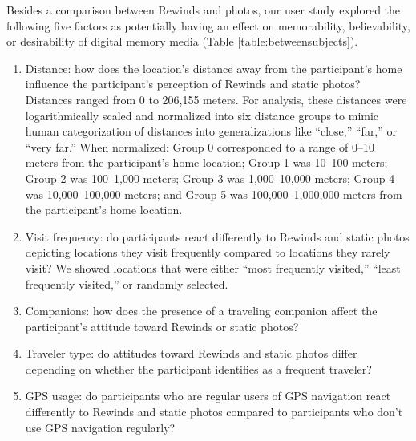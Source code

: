 \documentclass{sigchi}
\begin{document}
Besides a comparison between Rewinds and photos, our user study explored the following five factors as potentially having an effect on memorability, believability, or desirability of digital memory media (Table \ref{table:betweensubjects}).
\begin{enumerate}
	\item Distance: how does the location's distance away from the participant's home influence the participant's perception of Rewinds and static photos? Distances ranged from 0 to 206,155 meters. For analysis, these distances were logarithmically scaled and normalized into six distance groups to mimic human categorization of distances into generalizations like ``close,'' ``far,'' or ``very far.'' When normalized: Group 0 corresponded to a range of 0--10 meters from the participant's home location; Group 1 was 10--100 meters; Group 2 was 100--1,000 meters; Group 3 was 1,000--10,000 meters; Group 4 was 10,000--100,000 meters; and Group 5 was 100,000--1,000,000 meters from the participant's home location.  
	\item Visit frequency: do participants react differently to Rewinds and static photos depicting locations they visit frequently compared to locations they rarely visit? We showed locations that were either ``most frequently visited,'' ``least frequently visited,'' or randomly selected.
	\item Companions: how does the presence of a traveling companion affect the participant's attitude toward Rewinds or static photos?
	\item Traveler type: do attitudes toward Rewinds and static photos differ depending on whether the participant identifies as a frequent traveler?
	\item GPS usage: do participants who are regular users of GPS navigation react differently to Rewinds and static photos compared to participants who don't use GPS navigation regularly?
\end{enumerate}
\end{document}
